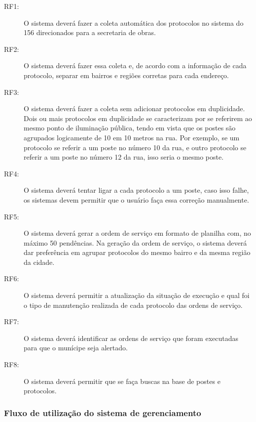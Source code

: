 \documentclass[
	article,			%
	11pt,				%
	oneside,			%
	a4paper,			%
	english,			%
	brazil,				%
	sumario=tradicional
	]{abntex2}
\begin{document}
\begin{description}
\item[RF1:] O sistema deverá fazer a coleta automática dos protocolos no sistema do 156 direcionados para a secretaria de obras.

\item[RF2:] O sistema deverá fazer essa coleta e, de acordo com a informação de cada protocolo, separar em bairros e regiões corretas para cada endereço.

\item[RF3:] O sistema deverá fazer a coleta sem adicionar protocolos em duplicidade.
Dois ou mais protocolos em duplicidade se caracterizam por se referirem ao
mesmo ponto de iluminação pública, tendo em vista que os postes são agrupados
logicamente de 10 em 10 metros na rua. Por exemplo, se um protocolo se referir
a um poste no número 10 da rua, e outro protocolo se referir a um poste no número
12 da rua, isso seria o mesmo poste.

\item[RF4:] O sistema deverá tentar ligar a cada protocolo a um poste, caso isso falhe, os sistemas devem permitir que o usuário faça essa correção manualmente.

\item[RF5:] O sistema deverá gerar a ordem de serviço em formato de planilha com, no máximo 50 pendências.
Na geração da ordem de serviço, o sistema deverá dar preferência em agrupar protocolos do mesmo bairro e da mesma região da cidade.

\item[RF6:] O sistema deverá permitir a atualização da situação de execução e qual foi o tipo de manutenção realizada de cada protocolo das ordens de serviço.

\item[RF7:] O sistema deverá identificar as ordens de serviço que foram executadas para que o munícipe seja alertado.

\item[RF8:] O sistema deverá permitir que se faça buscas na base de postes e protocolos.
\end{description}

\subsubsection{Fluxo de utilização do sistema de gerenciamento}
\end{document}
